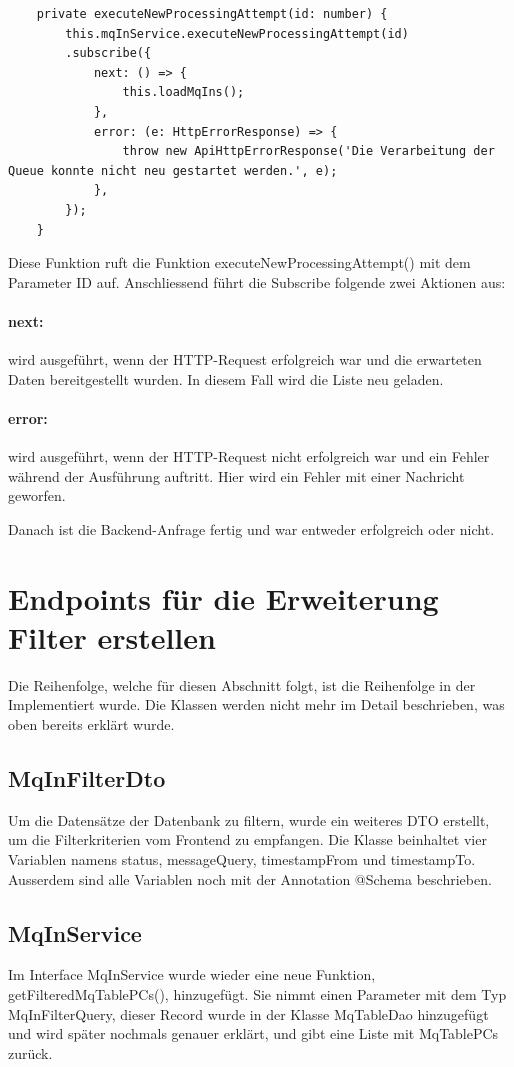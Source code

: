 \begin{verbatim}
	private executeNewProcessingAttempt(id: number) {
		this.mqInService.executeNewProcessingAttempt(id)
		.subscribe({
			next: () => {
				this.loadMqIns();
			},
			error: (e: HttpErrorResponse) => {
				throw new ApiHttpErrorResponse('Die Verarbeitung der Queue konnte nicht neu gestartet werden.', e);
			},
		});
	}
\end{verbatim}

\noindent Diese Funktion ruft die Funktion executeNewProcessingAttempt() mit dem Parameter ID auf. Anschliessend führt die Subscribe folgende zwei Aktionen aus:

\paragraph{next:} wird ausgeführt, wenn der HTTP-Request erfolgreich war und die erwarteten Daten bereitgestellt wurden. In diesem Fall wird die Liste neu geladen.
\paragraph{error:} wird ausgeführt, wenn der HTTP-Request nicht erfolgreich war und ein Fehler während der Ausführung auftritt. Hier wird ein Fehler mit einer Nachricht geworfen.\newline

\noindent Danach ist die Backend-Anfrage fertig und war entweder erfolgreich oder nicht.

\section{Endpoints für die Erweiterung Filter erstellen}
Die Reihenfolge, welche für diesen Abschnitt folgt, ist die Reihenfolge in der Implementiert wurde. Die Klassen werden nicht mehr im Detail beschrieben, was oben bereits erklärt wurde.

\subsection{MqInFilterDto}
Um die Datensätze der Datenbank zu filtern, wurde ein weiteres DTO erstellt, um die Filterkriterien vom Frontend zu empfangen. Die Klasse beinhaltet vier Variablen namens status, messageQuery, timestampFrom und timestampTo. Ausserdem sind alle Variablen noch mit der Annotation @Schema beschrieben.

\subsection{MqInService}
Im Interface MqInService wurde wieder eine neue Funktion, getFilteredMqTablePCs(), hinzugefügt. Sie nimmt einen Parameter mit dem Typ MqInFilterQuery, dieser Record wurde in der Klasse MqTableDao hinzugefügt und wird später nochmals genauer erklärt, und gibt eine Liste mit MqTablePCs zurück.


